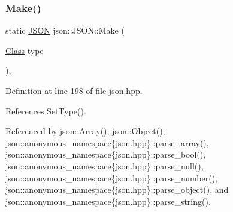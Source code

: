 \subsubsection{\texorpdfstring{Make()}{Make()}}
{\footnotesize\ttfamily static \mbox{\hyperlink{classjson_1_1_j_s_o_n}{J\+S\+ON}} json\+::\+J\+S\+O\+N\+::\+Make (\begin{DoxyParamCaption}\item[{\mbox{\hyperlink{classjson_1_1_j_s_o_n_a762f55df6d407c1af61607ed516ffe07}{Class}}}]{type }\end{DoxyParamCaption})\hspace{0.3cm}{\ttfamily [inline]}, {\ttfamily [static]}}



Definition at line 198 of file json.\+hpp.



References Set\+Type().



Referenced by json\+::\+Array(), json\+::\+Object(), json\+::anonymous\+\_\+namespace\{json.\+hpp\}\+::parse\+\_\+array(), json\+::anonymous\+\_\+namespace\{json.\+hpp\}\+::parse\+\_\+bool(), json\+::anonymous\+\_\+namespace\{json.\+hpp\}\+::parse\+\_\+null(), json\+::anonymous\+\_\+namespace\{json.\+hpp\}\+::parse\+\_\+number(), json\+::anonymous\+\_\+namespace\{json.\+hpp\}\+::parse\+\_\+object(), and json\+::anonymous\+\_\+namespace\{json.\+hpp\}\+::parse\+\_\+string().


